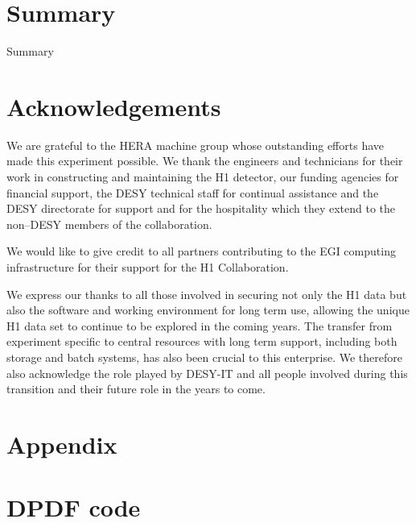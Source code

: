 \documentclass[12pt]{article}
\begin{document}
\section{Summary}
\label{sect:Conclusion}

Summary


\section*{Acknowledgements}
We are grateful to the HERA machine group whose outstanding
efforts have made this experiment possible.
We thank the engineers and technicians for their work in constructing and
maintaining the H1 detector, our funding agencies for
financial support, the
DESY technical staff for continual assistance
and the DESY directorate for support and for the
hospitality which they extend to the non--DESY
members of the collaboration.

We would like to give credit to all partners contributing to the EGI
computing infrastructure for their support for the H1 Collaboration.  

We express our thanks to all those involved in securing not only the
H1 data but also the software and working environment for long term
use, allowing the unique H1 data set to continue to be explored in the
coming years. The transfer from experiment specific to central
resources with long term support, including both storage and batch
systems, has also been crucial to this enterprise. We therefore also
acknowledge the role played by DESY-IT and all people involved during
this transition and their future role in the years to come.  




\clearpage
\appendix
\section*{Appendix}
\section{DPDF code}
\label{appx:DPDFcode}

%
%
\end{document}
